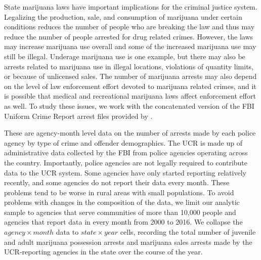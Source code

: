 \documentclass[12pt]{article}%
\begin{document}
State marijuana laws have important implications for the criminal justice system. Legalizing the production, sale, and consumption of marijuana under certain conditions reduces the number of people who are breaking the law and thus may reduce the number of people arrested for drug related crimes. However, the laws may increase marijuana use overall and some of the increased marijuana use may still be illegal. Underage marijuana use is one example, but there may also be arrests related to marijuana use in illegal locations, violations of quantity limits, or because of unlicensed sales. The number of marijuana arrests may also depend on the level of law enforcement effort devoted to marijuana related crimes, and it is possible that medical and recreational marijuana laws affect enforcement effort as well. To study these issues, we work with the concatenated version of the FBI Uniform Crime Report arrest files provided by \citet{kaplan2020}. 

These are agency-month level data on the number of arrests made by each police agency by type of crime and offender demographics. The UCR is made up of administrative data collected by the FBI from police agencies operating across the country. Importantly, police agencies are not legally required to contribute data to the UCR system. Some agencies have only started reporting relatively recently, and some agencies do not report their data every month. These problems tend to be worse in rural areas with small populations. To avoid problems with changes in the composition of the data, we limit our analytic sample to agencies that serve communities of more than 10,000 people and agencies that report data in every month from 2000 to 2016.%
We collapse the $agency \times month$ data to $state \times year$ cells, recording the total number of juvenile and adult marijuana possession arrests and marijuana sales arrests made by the UCR-reporting agencies in the state over the course of the year. 
\end{document}
